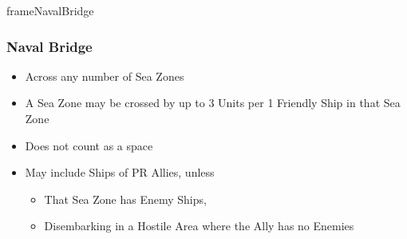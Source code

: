 \documentclass[10pt]{article}
\begin{document}
\begin{dynamiccontents*}{frameNavalBridge}
	\subsubsection*{Naval Bridge }
	\begin{itemize}
		\item Across any number of Sea Zones
		\item A Sea Zone may be crossed by up to 3 Units per 1 Friendly Ship in that Sea Zone
		\item Does not count as a space
		\item May include Ships of PR Allies, unless
		\begin{itemize}
			\item That Sea Zone has Enemy Ships, 
			\item Disembarking in a Hostile Area where the Ally has no Enemies
		\end{itemize}
	\end{itemize}
\end{dynamiccontents*}
\end{document}
